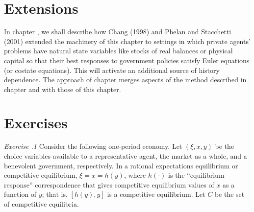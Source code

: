 \section{Extensions}
In chapter , we shall describe how
Chang (1998) and Phelan and Stacchetti (2001)  extended the
  machinery of this chapter to settings in which  private agents' problems
  have natural state variables like stocks of real balances or
  physical capital so that their best responses to government
  policies satisfy  Euler equations (or costate equations).  This will activate an additional source of history dependence.
  The approach of chapter  merges aspects of the method described
  in chapter  and  with those of this chapter.  %



\showchaptIDfalse
\showsectIDfalse
\section{Exercises}
\showchaptIDtrue
\showsectIDtrue
\medskip
\smallskip\noindent
{\it Exercise  \the\chapternum.1}\quad
 Consider the following one-period economy.  Let
$(\xi, x, y)$ be the choice variables available to a representative
agent, the market as a whole, and a benevolent government,
respectively.  In a rational expectations equilibrium or
competitive equilibrium,
$\xi = x = h(y)$, where $h(\cdot)$ is the ``equilibrium response''
correspondence that gives competitive equilibrium values of $x$
as a function of $y$; that is, $[h(y),y]$ is a competitive equilibrium.
Let $C$ be the set of competitive equilibria.

